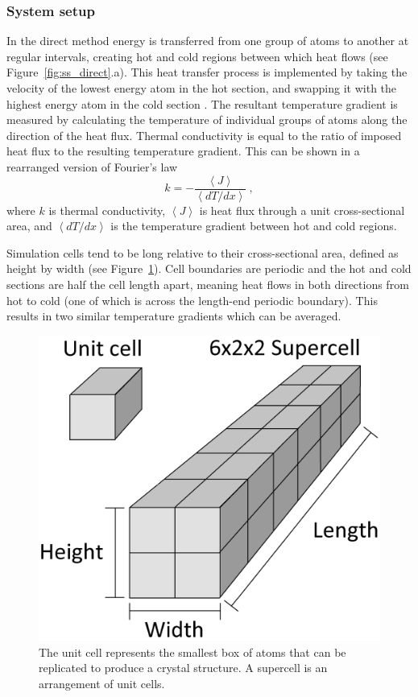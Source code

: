 \subsubsection{System setup}

In the direct method energy is transferred from one group of atoms to another at regular intervals, creating hot and cold regions between which heat flows (see Figure~\ref{fig:ss_direct}.a). This heat transfer process is implemented by taking the velocity of the lowest energy atom in the hot section, and swapping it with the highest energy atom in the cold section \citep{Muller-Plathe1997}. The resultant temperature gradient is measured by calculating the temperature of individual groups of atoms along the direction of the heat flux. Thermal conductivity is equal to the ratio of imposed heat flux to the resulting temperature gradient. This can be shown in a rearranged version of Fourier's law
%
\begin{equation}
k = - \frac{\left \langle J \right \rangle}{\left \langle dT/dx \right \rangle}\ ,
\label{fourier2}  
\end{equation}
%
where $k$ is thermal conductivity, $\left \langle J \right \rangle$ is heat flux through a unit cross-sectional area, and $\left \langle dT/dx \right \rangle$ is the temperature gradient between hot and cold regions. 

Simulation cells tend to be long relative to their cross-sectional area, defined as height by width (see Figure~\ref{fig:cell_dia}). Cell boundaries are periodic and the hot and cold sections are half the cell length apart, meaning heat flows in both directions from hot to cold (one of which is across the length-end periodic boundary). This results in two similar temperature gradients which can be averaged.

\begin{figure}[h!]
  \includegraphics[width=\linewidth]{Figures/cell_diagram.png}
  \caption{The unit cell represents the smallest box of atoms that can be replicated to produce a crystal structure. A supercell is an arrangement of unit cells.}
  \label{fig:cell_dia}
\end{figure}

